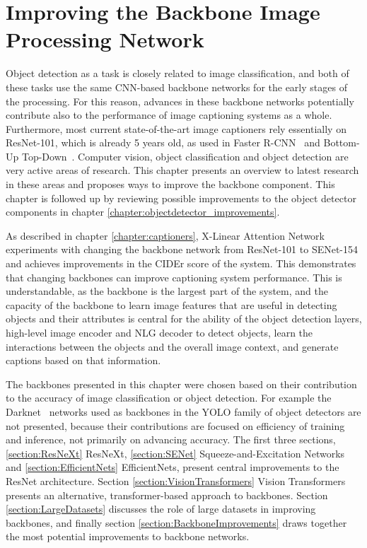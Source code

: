 \documentclass[english,twoside,openright]{HYgraduMLDS}
\begin{document}
\chapter{Improving the Backbone Image Processing Network}
\label{chapter:backbone}
Object detection as a task is closely related to image classification, and both of these tasks use the same CNN-based backbone networks for the early stages of the processing. For this reason, advances in these backbone networks potentially contribute also to the performance of image captioning systems as a whole. Furthermore, most current state-of-the-art image captioners rely essentially on ResNet-101, which is already 5 years old, as used in Faster R-CNN~\cite{FasterRCNN} and Bottom-Up Top-Down~\cite{BottomUp}. Computer vision, object classification and object detection are very active areas of research. This chapter presents an overview to latest research in these areas and proposes ways to improve the backbone component. This chapter is followed up by reviewing possible improvements to the object detector components in chapter \ref{chapter:objectdetector_improvements}.

As described in chapter \ref{chapter:captioners}, X-Linear Attention Network experiments with changing the backbone network from ResNet-101 to SENet-154 and achieves improvements in the CIDEr score of the system. This demonstrates that changing backbones can improve captioning system performance. This is understandable, as the backbone is the largest part of the system, and the capacity of the backbone to learn image features that are useful in detecting objects and their attributes is central for the ability of the object detection layers, high-level image encoder and NLG decoder to detect objects, learn the interactions between the objects and the overall image context, and generate captions based on that information.

The backbones presented in this chapter were chosen based on their contribution to the accuracy of image classification or object detection. For example the Darknet~\cite{YOLO9000, YOLOv3} networks used as backbones in the YOLO family of object detectors are not presented, because their contributions are focused on efficiency of training and inference, not primarily on advancing accuracy. The first three sections, \ref{section:ResNeXt} ResNeXt, \ref{section:SENet} Squeeze-and-Excitation Networks and \ref{section:EfficientNets} EfficientNets, present central improvements to the ResNet architecture. Section \ref{section:VisionTransformers} Vision Transformers presents an alternative, transformer-based approach to backbones. Section \ref{section:LargeDatasets} discusses the role of large datasets in improving backbones, and finally section \ref{section:BackboneImprovements} draws together the most potential improvements to backbone networks.
\end{document}
